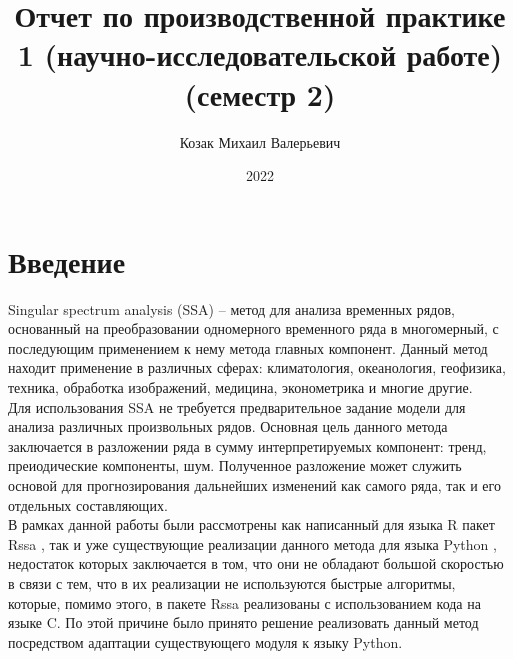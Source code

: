 \documentclass[specialist,
			   substylefile = spbu_report.rtx,
			   subf,href,colorlinks=true, 12pt]{disser}
\begin{document}
%
%

\title{Отчет по производственной практике 1 (научно-исследовательской работе) (семестр 2)}


\author{Козак Михаил Валерьевич}


\date{2022}

\maketitle

\tableofcontents

\chapter{Введение}

Singular spectrum analysis (SSA) \cite{ssa-method} – метод для анализа временных рядов, основанный на преобразовании одномерного временного ряда в многомерный, с последующим применением к нему метода главных компонент. Данный метод находит применение в различных сферах: климатология, океанология, геофизика, техника, обработка изображений, медицина, эконометрика и многие другие. \\

Для использования SSA не требуется предварительное задание модели для анализа различных произвольных рядов. Основная цель данного метода заключается в разложении ряда в сумму интерпретируемых компонент: тренд, преиодические компоненты, шум. Полученное разложение может служить основой для  прогнозирования дальнейших изменений как самого ряда, так и его отдельных составляющих.\\

В рамках данной работы были рассмотрены как написанный для языка R пакет Rssa \cite{rssa-book, rssa-doc}, так и уже существующие реализации данного метода для языка Python \cite{pyts-doc, kaggle-ssa-doc, git-kieferc-doc}, недостаток которых заключается в том, что они не обладают большой скоростью в связи с тем, что в их реализации не используются быстрые алгоритмы, которые, помимо этого, в пакете Rssa реализованы с использованием кода на языке C. По этой причине было принято решение реализовать данный метод посредством адаптации существующего модуля к языку Python. \\
\end{document}
